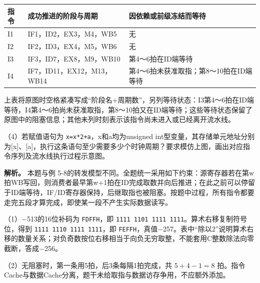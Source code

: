 \par\medskip\noindent\begin{minipage}{\linewidth}\fontsize{9.3}{12}\selectfont\begin{tabularx}{\linewidth}{@{}YYY@{}}
\toprule\noalign{}
\begin{minipage}[b]{\linewidth}\raggedright
指令
\end{minipage} & \begin{minipage}[b]{\linewidth}\raggedright
成功推进的阶段与周期
\end{minipage} & \begin{minipage}[b]{\linewidth}\raggedright
因依赖或前级冻结而等待
\end{minipage} \\
\midrule\noalign{}


I1 & IF1，ID2，EX3，M4，WB5 & 无 \\
I2 & IF2，ID3，EX4，M5，WB6 & 无 \\
I3 & IF3，ID7，EX8，M9，WB10 & 第4～6拍在ID端等待 \\
I4 & IF7，ID11，EX12，M13，WB14 & 第4～6拍未获准取指；第8～10拍在ID端等待 \\
\bottomrule\end{tabularx}
\end{minipage}\par\medskip

上表将原图时空格紧凑写成``阶段名+周期数''，另列等待状态：I3第4～6拍在ID端等待，I4第4～6拍尚未获准取指，第8～10拍又在ID端等待；这些等待状态保留了原图中的阻塞信息；其他未列时刻表示该指令尚未进入或已经离开流水线。

（4）若赋值语句为 \texttt{x=\allowbreak{}x*\allowbreak{}2+\allowbreak{}a}，x和a均为unsigned int型变量，其存储单元地址分别为{[}x{]}、{[}a{]}，执行这条语句至少需要多少个时钟周期？要求模仿上图，画出对应指令序列及流水线执行过程示意图。

\textbf{解析。} 本题与例 5-8的转发模型不同。全题统一采用如下约束：源寄存器若在第w拍WB写回，则消费者最早第w+1拍在ID完成取数并向后推进；在此之前可以停留于ID端等待，IF/ID寄存器保持，后继取指也被阻塞。按题中过程，所有指令都要走完五段才算完成，即使某一段不产生实际数据读写。

（1）\ensuremath{-}513的16位补码为 \texttt{FDFFH}，即 \texttt{1111 1101 1111 1111}。算术右移复制符号位，得到 \texttt{1111 1110 1111 1111}，即 \texttt{FEFFH}，真值\ensuremath{-}257。表中“除以2”说明算术右移的数量关系；对负奇数按位右移相当于向负无穷取整，不能套用C整数除法向零截断，答成\ensuremath{-}256。

（2）无阻塞时，第一条用5拍，后3条每隔1拍完成，共 \(5+4-1=8\) 拍。指令Cache与数据Cache分离，题干未给取指与数据访存争用，不应额外添加。

